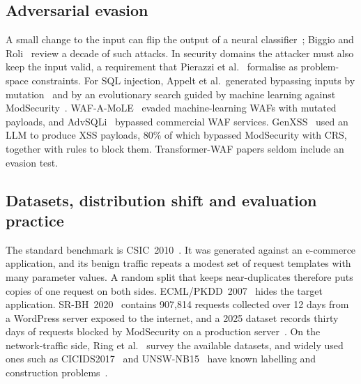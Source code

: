 \documentclass[preprint,11pt]{elsarticle}
\begin{document}
\subsection{Adversarial evasion}
A small change to the input can flip the output of a neural
classifier~\cite{goodfellow2015explaining,carlini2017towards}; Biggio and
Roli~\cite{biggio2018wild} review a decade of such attacks. In security
domains the attacker must also keep the input valid, a requirement that
Pierazzi et al.~\cite{pierazzi2020problemspace} formalise as problem-space
constraints. For SQL injection, Appelt et al.\ generated bypassing inputs
by mutation~\cite{appelt2014mutation} and by an evolutionary search guided
by machine learning against ModSecurity~\cite{appelt2018evolutionary}.
WAF-A-MoLE~\cite{demetrio2020wafamole} evaded machine-learning WAFs with
mutated payloads, and AdvSQLi~\cite{advsqli2024} bypassed commercial WAF
services. GenXSS~\cite{genxss2025} used an LLM to produce XSS payloads, 80\%
of which bypassed ModSecurity with CRS, together with rules to block them.
Transformer-WAF papers seldom include an evasion test.

\subsection{Datasets, distribution shift and evaluation practice}
The standard benchmark is CSIC~2010~\cite{gimenez2010csic}. It was
generated against an e-commerce application, and its benign traffic repeats
a modest set of request templates with many parameter values. A random
split that keeps near-duplicates therefore puts copies of one request on
both sides. ECML/PKDD~2007~\cite{pkdd2007} hides the target application.
SR-BH~2020~\cite{srbh2020} contains 907{,}814 requests collected over 12
days from a WordPress server exposed to the internet, and a 2025 dataset
records thirty days of requests blocked by ModSecurity on a production
server~\cite{modsec30day2025}. On the network-traffic side, Ring et
al.~\cite{ring2019datasets} survey the available datasets, and widely used
ones such as CICIDS2017~\cite{sharafaldin2018cicids} and
UNSW-NB15~\cite{moustafa2015unsw} have known labelling and construction
problems~\cite{engelen2021cicids}.
\end{document}
